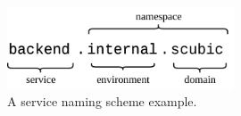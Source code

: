 \begin{figure}[!htbp]
    \centering
    \includegraphics[width=0.6\textwidth]{img/diagrams/pdf/service-naming.drawio.pdf}
    \caption[Service Naming Scheme]{A service naming scheme example.}
    \label{fig:service-naming}
\end{figure}
